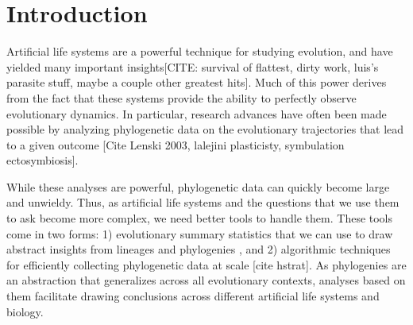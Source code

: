 \section{Introduction} \label{sec:introduction}

Artificial life systems are a powerful technique for studying evolution, and have yielded many important insights[CITE: survival of flattest, dirty work, luis's parasite stuff, maybe a couple other greatest hits]. Much of this power derives from the fact that these systems provide the ability to perfectly observe evolutionary dynamics. In particular, research advances have often been made possible by analyzing phylogenetic data on the evolutionary trajectories that lead to a given outcome [Cite Lenski 2003, lalejini plasticisty, symbulation ectosymbiosis].

While these analyses are powerful, phylogenetic data can quickly become large and unwieldy. Thus, as artificial life systems and the questions that we use them to ask become more complex, we need better tools to handle them. These tools come in two forms: 1) evolutionary summary statistics that we can use to draw abstract insights from lineages and phylogenies \citep{dolsonInterpretingTapeLife2020}, and 2) algorithmic techniques for efficiently collecting phylogenetic data at scale [cite hstrat]. As phylogenies are an abstraction that generalizes across all evolutionary contexts, analyses based on them facilitate drawing conclusions across different artificial life systems and biology. 



